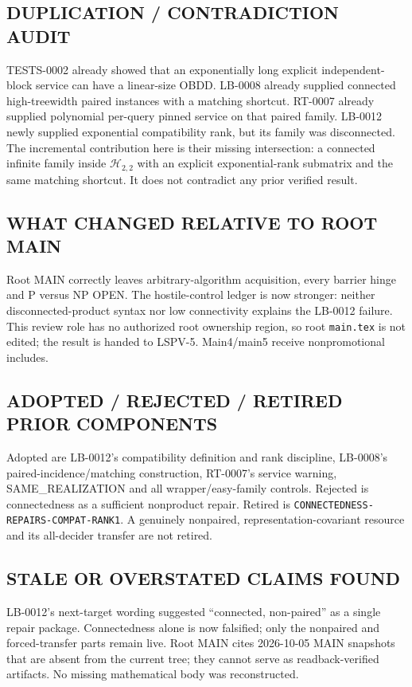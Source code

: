 \documentclass[11pt]{article}
\newcommand{\Htwo}{\mathcal H_{2,2}}
\begin{document}
\subsection*{DUPLICATION / CONTRADICTION AUDIT}
TESTS-0002 already showed that an exponentially long explicit independent-
block service can have a linear-size OBDD.  LB-0008 already supplied
connected high-treewidth paired instances with a matching shortcut.
RT-0007 already supplied polynomial per-query pinned service on that paired
family.  LB-0012 newly supplied exponential compatibility rank, but its
family was disconnected.  The incremental contribution here is their
missing intersection: a connected infinite family inside $\Htwo$ with an
explicit exponential-rank submatrix and the same matching shortcut.  It
does not contradict any prior verified result.

\subsection*{WHAT CHANGED RELATIVE TO ROOT MAIN}
Root MAIN correctly leaves arbitrary-algorithm acquisition, every barrier
hinge and P versus NP OPEN.  The hostile-control ledger is now stronger:
neither disconnected-product syntax nor low connectivity explains the
LB-0012 failure.  This review role has no authorized root ownership region,
so root \texttt{main.tex} is not edited; the result is handed to LSPV-5.
Main4/main5 receive nonpromotional includes.

\subsection*{ADOPTED / REJECTED / RETIRED PRIOR COMPONENTS}
Adopted are LB-0012's compatibility definition and rank discipline,
LB-0008's paired-incidence/matching construction, RT-0007's service warning,
SAME\_REALIZATION and all wrapper/easy-family controls.  Rejected is
connectedness as a sufficient nonproduct repair.  Retired is
\texttt{CONNECTEDNESS-REPAIRS-COMPAT-RANK1}.  A genuinely nonpaired,
representation-covariant resource and its all-decider transfer are not
retired.

\subsection*{STALE OR OVERSTATED CLAIMS FOUND}
LB-0012's next-target wording suggested ``connected, non-paired'' as a single
repair package.  Connectedness alone is now falsified; only the nonpaired
and forced-transfer parts remain live.  Root MAIN cites 2026-10-05 MAIN
snapshots that are absent from the current tree; they cannot serve as
readback-verified artifacts.  No missing mathematical body was reconstructed.
\end{document}
